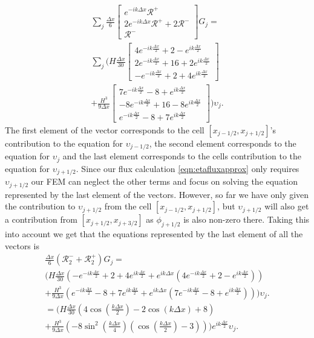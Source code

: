  \begin{multline*}
 \sum_j \frac{\Delta x}{6}\begin{bmatrix} e^{-ik\Delta x} \mathcal{R}^+ \\2 e^{-ik\Delta x} \mathcal{R}^+ +2 \mathcal{R}^-\\ \mathcal{R}^- \end{bmatrix} G_j = \\\sum_j \Bigg(H\frac{\Delta x}{30}\begin{bmatrix} 4e^{-ik\frac{\Delta x}{2}} +  2 - e^{ik\frac{\Delta x}{2}}\\2e^{-ik\frac{\Delta x}{2}}  + 16  +2 e^{ik\frac{\Delta x}{2}}  \\ -e^{-ik\frac{\Delta x}{2}} +  2 + 4e^{ik\frac{\Delta x}{2}} \end{bmatrix} \\+ \frac{H^3 }{9\Delta x}\begin{bmatrix} 7e^{-ik\frac{\Delta x}{2}} -8 + e^{ik\frac{\Delta x}{2}} \\ -8e^{-ik\frac{\Delta x}{2}} +  16  -8e^{ik\frac{\Delta x}{2}} \\ e^{-ik\frac{\Delta x}{2}} -8 + 7e^{ik\frac{\Delta x}{2}} \end{bmatrix}  \Bigg) \upsilon_j.
 \end{multline*}
 The first element of the vector corresponds to the cell $\left[x_{j-1/2}, x_{j+1/2}\right]$'s contribution to the equation for $\upsilon_{j-1/2}$, the second element corresponds to the equation for $\upsilon_{j}$ and the last element corresponds to the cells contribution to the equation for $\upsilon_{j +1/2}$. Since our flux calculation \eqref{eqn:etafluxapprox} only requires $\upsilon_{j+1/2}$ our FEM can neglect the other terms and focus on solving the equation represented by the last element of the vectors. However, so far we have only given the contribution to $\upsilon_{j+1/2}$ from the cell $\left[x_{j-1/2},x_{j+1/2}\right]$, but $\upsilon_{j+1/2}$ will also get a contribution from $\left[x_{j+1/2},x_{j+3/2}\right]$ as $\phi_{j+1/2}$ is also non-zero there. Taking this into account we get that the equations represented by the last element of all the vectors is
 \begin{multline*}
 \frac{\Delta x}{6} \left(\mathcal{R}^-_2 + \mathcal{R}^+_2 \right)G_j = \\ \Bigg(H\frac{\Delta x}{30} \left( -e^{-ik\frac{\Delta x}{2}} +  2 + 4e^{ik\frac{\Delta x}{2}} + e^{ik{\Delta x}}\left(4e^{-ik\frac{\Delta x}{2}} +  2 - e^{ik\frac{\Delta x}{2}}\right) \right)  \\+ \frac{H^3 }{9\Delta x} \left(  e^{-ik\frac{\Delta x}{2}} -8 + 7e^{ik\frac{\Delta x}{2}}  + e^{ik{\Delta x}}\left(7e^{-ik\frac{\Delta x}{2}} -8 + e^{ik\frac{\Delta x}{2}}  \right)  \right)   \Bigg) \upsilon_j.
\\ =  \Bigg(H\frac{\Delta x}{30} \left( 4\cos\left(\frac{k \Delta x}{2}\right) - 2\cos\left({k \Delta x}\right) + 8\right)   \\+ \frac{H^3 }{9\Delta x} \left(-8 \sin^2\left(\frac{k \Delta x}{4}\right)\left(\cos\left(\frac{k \Delta x}{2}\right) - 3 \right)       \right) \Bigg)  e^{ik\frac{\Delta x}{2}} \upsilon_j.
  \end{multline*}

